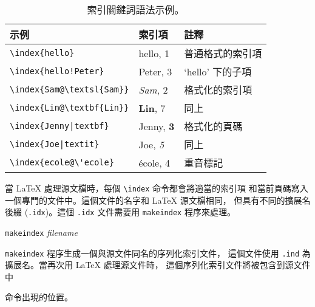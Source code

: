 \begin{table}[!tp]
\caption{索引關鍵詞語法示例。} \label{index}
\begin{center}
\begin{tabular}{@{}lll@{}}
  \textbf{示例} &\textbf{索引項} &\textbf{註釋}\\\hline
  \rule{0pt}{1.05em}\verb|\index{hello}| &hello, 1 & 普通格式的索引項\\
\verb|\index{hello!Peter}|   &\hspace*{2ex}Peter, 3 & `hello' 下的子項\\
\verb|\index{Sam@\textsl{Sam}}|     &\textsl{Sam}, 2& 格式化的索引項\\
\verb|\index{Lin@\textbf{Lin}}|     &\textbf{Lin}, 7& 同上\\
\verb.\index{Jenny|textbf}.     &Jenny, \textbf{3}& 格式化的頁碼\\
\verb.\index{Joe|textit}.     &Joe, \textit{5}& 同上\\
\verb.\index{ecole@\'ecole}.     &\'ecole, 4& 重音標記
\end{tabular}
\end{center}
\end{table}


當 \LaTeX{} 處理源文檔時，每個 \verb|\index| 命令都會將適當的索引項
和當前頁碼寫入一個專門的文件中。這個文件的名字和 \LaTeX{} 源文檔相同，
但具有不同的擴展名後綴 (\verb|.idx|)。這個 \texttt{.idx} 文件需要用
 \texttt{makeindex} 程序來處理。


\begin{lscommand}
  \texttt{makeindex} \emph{filename}
\end{lscommand}
\texttt{makeindex} 程序生成一個與源文件同名的序列化索引文件，
這個文件使用 \texttt{.ind} 為擴展名。當再次用 \LaTeX{} 處理源文件時，
這個序列化索引文件將被包含到源文件中
\begin{lscommand}
\end{lscommand}
\noindent 命令出現的位置。

